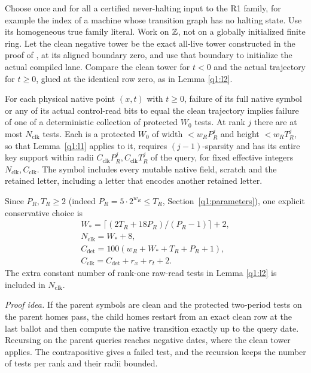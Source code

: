 \begin{lemma}\label{q1:l3}

Choose once and for all a certified never-halting input to the R1 family, for example the index of a machine whose transition graph has no halting state. Use its homogeneous true family literal. Work on \(\mathbb Z\), not on a globally initialized finite ring. Let the clean negative tower be the exact all-live tower constructed in the proof of \cite[Lemma~\ref*{cl:lem:past}]{DMNoise1D2026}, at its aligned boundary zero, and use that boundary to initialize the actual compiled lane. Compare the clean tower for \(t<0\) and the actual trajectory for \(t\ge 0\), glued at the identical row zero, as in Lemma \ref{q1:l2}.

For each physical native point \((x,t)\) with \(t\ge 0\), failure of its full native symbol or any of its actual control-read bits to equal the clean trajectory implies failure of one of a deterministic collection of protected \(W_0\) tests. At rank \(j\) there are at most \(N_{\mathrm{clk}}\) tests. Each is a protected \(W_0\) of width \(<w_{R}P_{R}^{j}\) and height \(<w_{R}T_{R}^{j}\), so that Lemma~\ref{q1:l1} applies to it, requires \((j-1)\)-sparsity and has its entire key support within radii \(C_{\mathrm{clk}} P_{R}^{j},C_{\mathrm{clk}} T_{R}^{j}\) of the query, for fixed effective integers \(N_{\mathrm{clk}},C_{\mathrm{clk}}\). The symbol includes every mutable native field, scratch and the retained letter, including a letter that encodes another retained letter.

Since \(P_{R},T_{R}\ge 2\) (indeed \(P_R=5\cdot2^{w_R}\le T_R\), Section~\ref{q1:parameters}), one explicit conservative choice is
\[
\begin{gathered}
W_{*} = \lceil (2T_{R}+18P_{R})/(P_{R}-1)\rceil + 2, \\ N_{\mathrm{clk}} = W_{*} + 8, \\ C_{\mathrm{det}} = 100(w_{R}+W_{*}+T_{R}+P_{R}+1), \\ C_{\mathrm{clk}} = C_{\mathrm{det}}+r_{x}+r_{t}+2.
\end{gathered}
\]
The extra constant number of rank-one raw-read tests in Lemma \ref{q1:l2} is included in \(N_{\mathrm{clk}}\).

\end{lemma}
\par\noindent\emph{Proof idea.} If the parent symbols are clean and the protected two-period tests on the parent homes pass, the child homes restart from an exact clean row at the last ballot and then compute the native transition exactly up to the query date. Recursing on the parent queries reaches negative dates, where the clean tower applies. The contrapositive gives a failed test, and the recursion keeps the number of tests per rank and their radii bounded.


